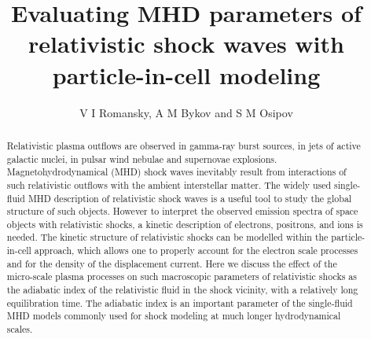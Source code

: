 \documentclass[a4paper]{jpconf}
\begin{document}
	\title{Evaluating MHD parameters of relativistic shock waves with particle-in-cell modeling}
	
	\author{V I Romansky, A M Bykov and S M Osipov}
	
	\address{Ioffe Institute, 26 Politekhnicheskaya st., St. Petersburg 194021, Russia}
	
	
	\begin{abstract}
		Relativistic plasma outflows are observed in gamma-ray burst
		sources, in jets of active galactic nuclei, in pulsar wind nebulae and
		supernovae explosions. Magnetohydrodynamical (MHD) shock waves
		inevitably result from interactions of such relativistic outflows with
		the ambient interstellar matter. The widely used single-fluid MHD
		description of relativistic shock waves is a useful tool to study the
		global structure of such objects. However to interpret the observed
		emission spectra of space objects with relativistic shocks, a kinetic
		description of electrons, positrons, and ions is needed. The kinetic
		structure of relativistic shocks can be modelled within the
		particle-in-cell approach, which allows one to properly account for
		the electron scale processes and for the density of the displacement
		current. Here we discuss the effect of the micro-scale plasma processes on such
		macroscopic parameters of relativistic shocks as the adiabatic index
		of the relativistic fluid in the shock vicinity, with a relatively
		long equilibration time. The adiabatic index is an important parameter of the
		single-fluid MHD models commonly used for shock modeling at much
		longer hydrodynamical scales.
	\end{abstract}
	
\end{document}
